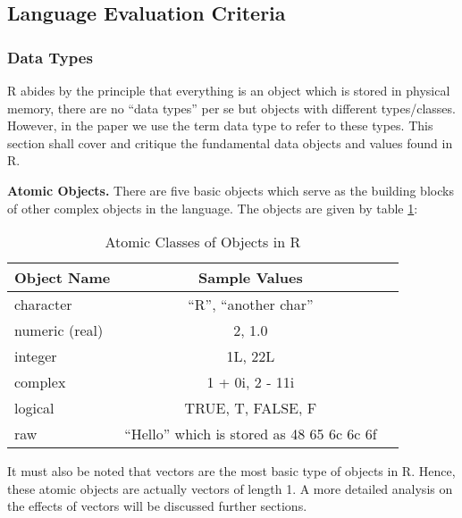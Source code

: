 \documentclass[12pt]{article}
\begin{document}
\subsection{Language Evaluation Criteria}

\subsubsection{Data Types}
R abides by the principle that everything is an object which is stored in physical memory, there are no ``data types'' per se but objects with different types/classes. However, in the paper we use the term data type to refer to these types. This section shall cover and critique the fundamental data objects and values found in R.

\textbf{Atomic Objects.} There are five basic objects which serve as the building blocks of other complex objects in the language. The objects are given by table \ref{tab:table1}:

\begin{table}[h!] \label{table1}
  \begin{center}
    \caption{Atomic Classes of Objects in R}
    \label{tab:table1}
    \begin{tabular}{|l|c|l|}
      \toprule %
      \textbf{Object Name} & \textbf{Sample Values} \\
      \midrule %
      character & ``R'', ``another char'' \\
      \hline
      numeric (real) & 2, 1.0 \\
      \hline
      integer & 1L, 22L \\
      \hline
      complex & 1 + 0i, 2 - 11i \\
      \hline
      logical & TRUE, T, FALSE, F \\
      \hline
      raw & ``Hello'' which is stored as 48 65 6c 6c 6f \\
      \bottomrule
    \end{tabular}
  \end{center}
\end{table}

It must also be noted that vectors are the most basic type of objects in R. Hence, these atomic objects are actually vectors of length 1. A more detailed analysis on the effects of vectors will be discussed further sections.
\end{document}
